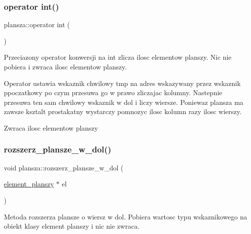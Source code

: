 \subsubsection{\texorpdfstring{operator int()}{operator int()}}
{\footnotesize\ttfamily plansza\+::operator int (\begin{DoxyParamCaption}{ }\end{DoxyParamCaption})}

Przeciazony operator konwersji na int zlicza ilosc elementow planszy. Nic nie pobiera i zwraca ilosc elementow planszy.

Operator ustawia wskaznik chwilowy tmp na adres wskazywany przez wskaznik ppoczatkowy po czym przesuwa go w prawo zliczajac kolumny. Nastepnie przesuwa ten sam chwilowy wskaznik w dol i liczy wiersze. Poniewaz plansza ma zawsze ksztalt prostakatny wystarczy pomnozyc ilosc kolumn razy ilosc wierszy. \begin{DoxyReturn}{Zwraca}
ilosc elementow planszy 
\end{DoxyReturn}
\mbox{\label{classplansza_a6b7712b23870fbe508d00e68a740e853}} 
\subsubsection{\texorpdfstring{rozszerz\+\_\+plansze\+\_\+w\+\_\+dol()}{rozszerz\_plansze\_w\_dol()}}
{\footnotesize\ttfamily void plansza\+::rozszerz\+\_\+plansze\+\_\+w\+\_\+dol (\begin{DoxyParamCaption}\item[{\mbox{\hyperlink{classelement__planszy}{element\+\_\+planszy}} $\ast$}]{el }\end{DoxyParamCaption})}

Metoda rozszerza plansze o wiersz w dol. Pobiera wartosc typu wskaznikowego na obiekt klasy element planszy i nic nie zwraca.

